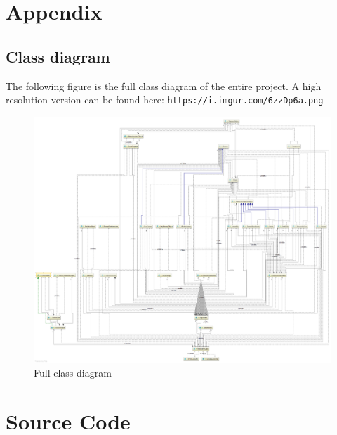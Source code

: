 \documentclass[12p]{article}
\begin{document}
\newpage
\printbibliography[heading=bibintoc,title={References}]


\newpage
\appendix

\section{Appendix}

\subsection{Class diagram} \label{AppendixClassDiagramFull}

The following figure is the full class diagram of the entire project. A high resolution version can be found here: \texttt{https://i.imgur.com/6zzDp6a.png}

\begin{figure}[ht]
  \centering
  \includegraphics[width=1\textwidth]{Documentation/class_diagram}
  \caption{Full class diagram}
  \label{fig:ClassDiagramFull}
\end{figure}


\section{Source Code}
\end{document}

